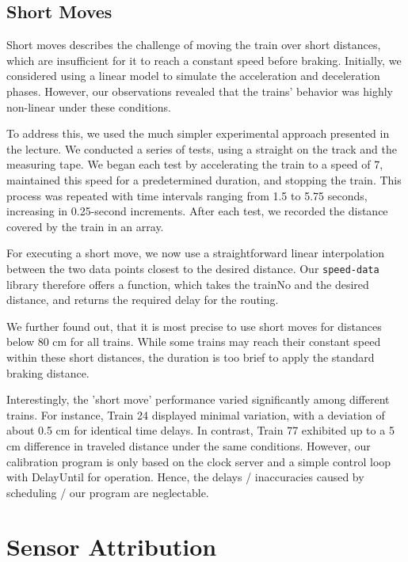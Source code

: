 \documentclass[12pt, titlepage]{article}
\begin{document}
    \subsection{Short Moves}
    \label{sec:short-moves}
    Short moves describes the challenge of moving the train over short distances, which are insufficient for it to reach a constant speed before braking. 
    Initially, we considered using a linear model to simulate the acceleration and deceleration phases. 
    However, our observations revealed that the trains' behavior was highly non-linear under these conditions.

    To address this, we used the much simpler experimental approach presented in the lecture. 
    We conducted a series of tests, using a straight on the track and the measuring tape. 
    We began each test by accelerating the train to a speed of 7, maintained this speed for a predetermined duration, and stopping the train. 
    This process was repeated with time intervals ranging from 1.5 to 5.75 seconds, increasing in 0.25-second increments. 
    After each test, we recorded the distance covered by the train in an array.

    For executing a short move, we now use a straightforward linear interpolation between the two data points closest to the desired distance. 
    Our \verb'speed-data' library therefore offers a function, which takes the trainNo and the desired distance, and returns the required delay for the routing.
    
    We further found out, that it is most precise to use short moves for distances below 80 cm for all trains. 
    While some trains may reach their constant speed within these short distances, the duration is too brief to apply the standard braking distance.

    Interestingly, the 'short move' performance varied significantly among different trains. 
    For instance, Train 24 displayed minimal variation, with a deviation of about 0.5 cm for identical time delays. 
    In contrast, Train 77 exhibited up to a 5 cm difference in traveled distance under the same conditions. 
    However, our calibration program is only based on the clock server and a simple control loop with DelayUntil for operation.
    Hence, the delays / inaccuracies caused by scheduling / our program are neglectable.


    \section{Sensor Attribution}
    \label{sec:sensor-attribution}
    
\end{document}
